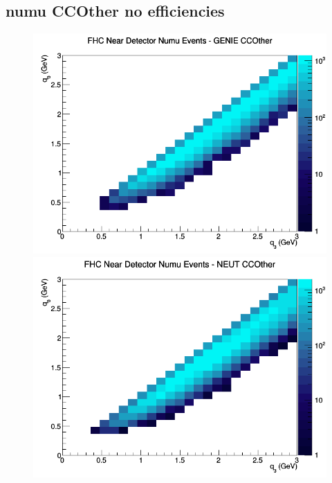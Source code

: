 \documentclass[12pt]{article}
\begin{document}
\subsection{numu CCOther no efficiencies}
\begin{figure}[h]
\includegraphics[width=\linewidth]{q0_q3/nominal/CCOther_FHC_ND_numu_q3_q0_GENIE.png}
\endminipage
{}
\includegraphics[width=\linewidth]{q0_q3/nominal/CCOther_FHC_ND_numu_q3_q0_NEUT.png}
\endminipage
{}

\end{figure}
\end{document}
